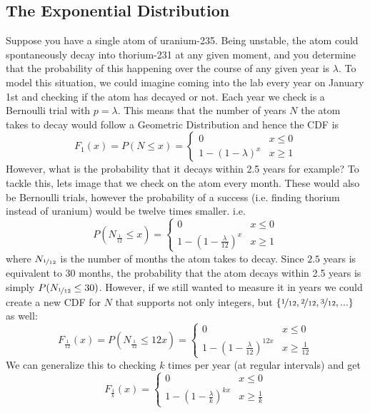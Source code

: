 \subsection{The Exponential Distribution}
\newcommand{\expon}{\textup{Exp}}
Suppose you have a single atom of uranium-235. Being unstable, the atom could spontaneously decay into thorium-231 at any given moment, and you determine that the probability of this happening over the course of any given year is $\lambda$. To model this situation, we could imagine coming into the lab every year on January 1st and checking if the atom has decayed or not. Each year we check is a Bernoulli trial with $p=\lambda$. This means that the number of years $N$ the atom takes to decay would follow a Geometric Distribution and hence the CDF is
\[
    F_1(x)
    = P(N\le x)
    = \begin{cases}
        0 & x \le 0
        \\
        1-(1-\lambda)^x & x\ge 1
    \end{cases}
\]
However, what is the probability that it decays within 2.5 years for example? To tackle this, lets image that we check on the atom every month. These would also be Bernoulli trials, however the probability of a success (i.e. finding thorium instead of uranium) would be twelve times smaller. i.e. 
\[
    P(N_{\frac 1{12}}\le x)
    = \begin{cases}
        0 & x \le 0
        \\
        1-\left(1-\frac \lambda {12}\right)^x & x\ge 1
    \end{cases}
\]
where $N_{\nicefrac 1{12}}$ is the number of months the atom takes to decay. Since $2.5$ years is equivalent to 30 months, the probability that the atom decays within 2.5 years is simply $P(N_{\nicefrac 1{12}} \le 30)$. However, if we still wanted to measure it in years we could create a new CDF for $N$ that supports not only integers, but $\{\nicefrac 1{12} , \nicefrac 2{12}, \nicefrac 3{12},...\}$ as well:
\[
    F_{\frac 1{12}}(x) 
    = P\left(N_{\frac 1{12}}\le 12x\right)
    = \begin{cases}
        0 & x \le 0
        \\
        1-\left(1-\frac \lambda {12}\right)^{12x} & x\ge \frac 1{12}
    \end{cases}
\]
We can generalize this to checking $k$ times per year (at regular intervals) and get
\[
    F_{\frac 1k}(x) 
    = \begin{cases}
        0 & x \le 0
        \\
        1-\left(1-\frac \lambda k\right)^{kx} & x\ge \frac 1k
    \end{cases}
\]
